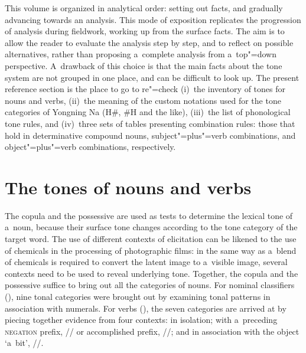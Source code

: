 


\begin{refsection}
	
This volume is organized in analytical order: setting out facts, and gradually advancing towards an analysis. This mode of exposition replicates the progression of analysis during fieldwork, working up from the surface
facts. The aim is to allow the reader to evaluate the analysis step by step, and to reflect on
possible alternatives, rather than proposing a~complete analysis from a~top"=down perspective. A~drawback of this choice is that the main facts about the tone system are not grouped in one place, and can be difficult to look up. The present reference section is the place to go to re"=check (i)~the inventory of tones for nouns and verbs, (ii)~the meaning of the custom notations used for the tone categories of Yongning Na (H\#, \#H and the like), (iii)~the list of phonological tone rules, and (iv)~three sets of tables presenting combination rules: those that hold in determinative compound nouns, subject"=plus"=verb combinations, and object"=plus"=verb combinations, respectively.

\section*{The tones of nouns and verbs}
\label{sec:tonesofN}

	The copula and the possessive are used as tests to determine the lexical tone of a~noun, because their surface tone changes according to the tone category of the target word. The use of different contexts of elicitation can be likened to the use of chemicals in the processing of photographic films: in the same way as a~blend of chemicals is required to convert the latent image to a~visible image, several contexts need to be used to reveal underlying tone. Together, the copula and the possessive suffice to bring out all the categories of nouns. For nominal classifiers (), nine tonal categories were brought out by examining tonal patterns in association with numerals. For verbs (), the seven categories are arrived at by piecing together evidence from four contexts: in isolation; with a~preceding \textsc{negation} prefix, // or accomplished prefix, //; and in association with the object ‘a~bit’, //.


\end{refsection}
